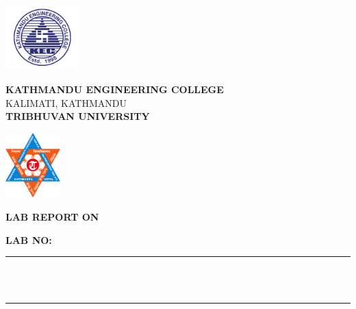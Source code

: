 
\begin{titlepage}
\begin{center}

\begin{minipage}{2.5cm}
	\begin{center}
		\includegraphics[height=2.5cm]{./logo/kec_logo.PNG}
	\end{center}
\end{minipage}\hfill
\begin{minipage}{10cm}
	\begin{center}
	\Large{\textbf{KATHMANDU ENGINEERING COLLEGE}}\\[0.1cm]
    \small{KALIMATI, KATHMANDU}\\[0.1cm]
    \textbf{TRIBHUVAN UNIVERSITY}
	\end{center}
\end{minipage}\hfill
\begin{minipage}{2.5cm}
	\begin{center}
		\includegraphics[height=2.5cm]{./logo/tu_logo.jpg}
	\end{center}
\end{minipage}

\vspace{3.5cm}

{\huge \bfseries \uppercase{lab report on} \\[0.5cm] }
{\large \bfseries \subjectname}

\vspace{2.5cm}
{\large \bfseries LAB NO: \labnumber}\\[0.5cm]

\rule{\linewidth}{0.3mm} \\[0.4cm]
{ \huge \bfseries\color{blue} \labtopic \\[0.4cm] }
\rule{\linewidth}{0.3mm} \\[3cm]


\end{center}
\end{titlepage}
